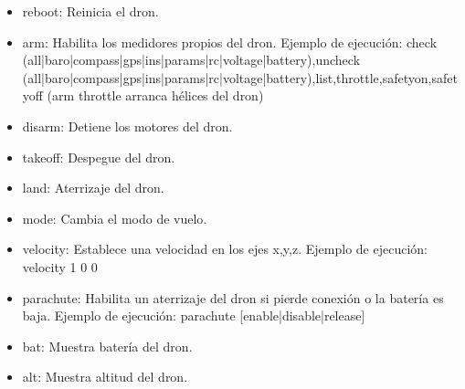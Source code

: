 \begin{itemize}
\label{comandos}
\item reboot: Reinicia el dron.
\item arm: Habilita los medidores propios del dron. Ejemplo de ejecución: check (all|baro|compass|gps|ins|params|rc|voltage|battery),uncheck (all|baro|compass|gps|ins|params|rc|voltage|battery),list,throttle,safetyon,safetyoff (arm throttle arranca hélices del dron)
\item disarm: Detiene los motores del dron.
\item takeoff: Despegue del dron.
\item land: Aterrizaje del dron.
\item mode: Cambia el modo de vuelo.
\item velocity: Establece una velocidad en los ejes x,y,z. Ejemplo de ejecución: velocity 1 0 0
\item parachute: Habilita un aterrizaje del dron si pierde conexión o la batería es baja. Ejemplo de ejecución: parachute [enable|disable|release]
\item bat: Muestra batería del dron.
\item alt: Muestra altitud del dron.
\end{itemize}
